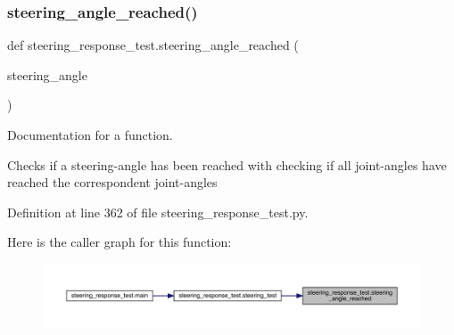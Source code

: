 \subsubsection{\texorpdfstring{steering\_angle\_reached()}{steering\_angle\_reached()}}
{\footnotesize\ttfamily def steering\+\_\+response\+\_\+test.\+steering\+\_\+angle\+\_\+reached (\begin{DoxyParamCaption}\item[{}]{steering\+\_\+angle }\end{DoxyParamCaption})}



Documentation for a function. 

Checks if a steering-\/angle has been reached with checking if all joint-\/angles have reached the correspondent joint-\/angles 

Definition at line 362 of file steering\+\_\+response\+\_\+test.\+py.


\begin{DoxyCode}{0}

\end{DoxyCode}
Here is the caller graph for this function\+:\nopagebreak
\begin{figure}[H]
\begin{center}
\leavevmode
\includegraphics[width=350pt]{namespacesteering__response__test_a2f87b67822170ef5c3a9a868293aeedc_icgraph}
\end{center}
\end{figure}
\mbox{\label{namespacesteering__response__test_a47db8892f945cf998a098d03b6dbf3e6}} 
